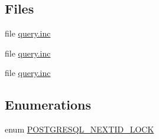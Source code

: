 \subsection*{Files}
\begin{DoxyCompactItemize}
\item 
file \hyperlink{mysql_2query_8inc}{query.inc}
\item 
file \hyperlink{pgsql_2query_8inc}{query.inc}
\item 
file \hyperlink{query_8inc}{query.inc}
\end{DoxyCompactItemize}
\subsection*{Enumerations}
\begin{DoxyCompactItemize}
\item 
enum \hyperlink{group__database_ga9f09406f95a22d365c9faa8721f57126}{POSTGRESQL\_\-NEXTID\_\-LOCK} 
\end{DoxyCompactItemize}
